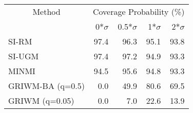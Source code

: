 
\begin{tabular}{lrrrr}
\toprule
\multicolumn{1}{c}{Method} & \multicolumn{4}{c}{Coverage Probability (\%)} \\
 & 0*$\sigma$ & 0.5*$\sigma$ & 1*$\sigma$ & 2*$\sigma$\\
\midrule
SI-RM & 97.4 & 96.3 & 95.1 & 93.8\\
SI-UGM & 97.4 & 97.2 & 94.9 & 93.3\\
MINMI & 94.5 & 95.6 & 94.8 & 93.3\\
GRIWM-BA (q=0.5) & 0.0 & 49.9 & 80.6 & 69.5\\
GRIWM (q=0.05) & 0.0 & 7.0 & 22.6 & 13.9\\
\bottomrule
\end{tabular}
